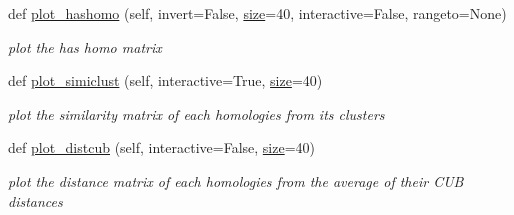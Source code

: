 \begin{DoxyCompactItemize}
def \mbox{\hyperlink{class_py_c_u_b_1_1homoset_1_1_homo_set_a8ab62bae7be17abf4b13ad37d5c881eb}{plot\+\_\+hashomo}} (self, invert=False, \mbox{\hyperlink{class_py_c_u_b_1_1homoset_1_1_homo_set_a000511647e3f85d8abadcdddaddfb04d}{size}}=40, interactive=False, rangeto=None)
\begin{DoxyCompactList}\small\item\em plot the has homo matrix \end{DoxyCompactList}\item 
def \mbox{\hyperlink{class_py_c_u_b_1_1homoset_1_1_homo_set_a87fcd4602c943c98543e2bc552502663}{plot\+\_\+simiclust}} (self, interactive=True, \mbox{\hyperlink{class_py_c_u_b_1_1homoset_1_1_homo_set_a000511647e3f85d8abadcdddaddfb04d}{size}}=40)
\begin{DoxyCompactList}\small\item\em plot the similarity matrix of each homologies from its clusters \end{DoxyCompactList}\item 
def \mbox{\hyperlink{class_py_c_u_b_1_1homoset_1_1_homo_set_aa385d8acea32381efae12c219c24a331}{plot\+\_\+distcub}} (self, interactive=False, \mbox{\hyperlink{class_py_c_u_b_1_1homoset_1_1_homo_set_a000511647e3f85d8abadcdddaddfb04d}{size}}=40)
\begin{DoxyCompactList}\small\item\em plot the distance matrix of each homologies from the average of their C\+UB distances \end{DoxyCompactList}\end{DoxyCompactItemize}
